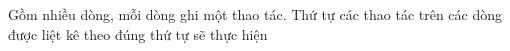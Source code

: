 Gồm nhiều dòng, mỗi dòng ghi một thao tác. Thứ tự các thao tác trên các dòng được liệt kê theo đúng thứ tự sẽ thực hiện